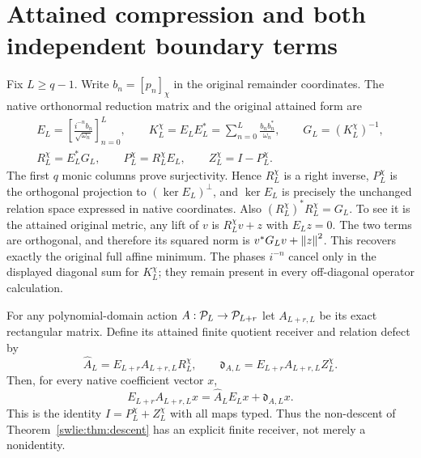 \documentclass[11pt]{article}
\begin{document}
\section{Attained compression and both independent boundary terms}

Fix $L\geq q-1$. Write $b_n=[p_n]_\chi$ in the original
remainder coordinates. The native orthonormal reduction
matrix and the original attained form are
\begin{equation}\label{swlie:eq:finitequotient}
 \begin{gathered}
 E_L=\left[\frac{i^{-n}b_n}{\sqrt{\omega_n}}\right]_{n=0}^L,
 \qquad K_L^\chi=E_LE_L^*
           =\sum_{n=0}^L\frac{b_nb_n^*}{\omega_n},
 \qquad G_L=(K_L^\chi)^{-1},\\
 R_L^\chi=E_L^*G_L,\qquad
 P_L^\chi=R_L^\chi E_L,\qquad Z_L^\chi=I-P_L^\chi.
 \end{gathered}
\end{equation}
The first $q$ monic columns prove surjectivity.
Hence $R_L^\chi$ is a right inverse, $P_L^\chi$
is the orthogonal projection to $(\ker E_L)^\perp$,
and $\ker E_L$ is precisely the unchanged relation
space expressed in native coordinates.
Also $(R_L^\chi)^*R_L^\chi=G_L$.
To see it is the attained original metric, any lift
of $v$ is $R_L^\chi v+z$ with $E_Lz=0$.
The two terms are orthogonal, and therefore its
squared norm is $v^*G_Lv+\left\lVert z\right\rVert^2$.
This recovers exactly the original full affine minimum.
The phases $i^{-n}$ cancel only in the displayed
diagonal sum for $K_L^\chi$; they remain present
in every off-diagonal operator calculation.

For any polynomial-domain action $A:\mathcal P_L\to\mathcal P_{L+r}$
let $A_{L+r,L}$ be its exact rectangular matrix.
Define its attained finite quotient receiver and relation
defect by
\begin{equation}\label{swlie:eq:generalreceiver}
 \widehat A_L=E_{L+r}A_{L+r,L}R_L^\chi,\qquad
 \mathfrak d_{A,L}=E_{L+r}A_{L+r,L}Z_L^\chi.
\end{equation}
Then, for every native coefficient vector $x$,
\begin{equation}\label{swlie:eq:relationidentity}
 E_{L+r}A_{L+r,L}x
        =\widehat A_LE_Lx+\mathfrak d_{A,L}x.
\end{equation}
This is the identity $I=P_L^\chi+Z_L^\chi$ with
all maps typed. Thus the non-descent of
Theorem~\ref{swlie:thm:descent} has an explicit finite receiver,
not merely a nonidentity.
\end{document}
